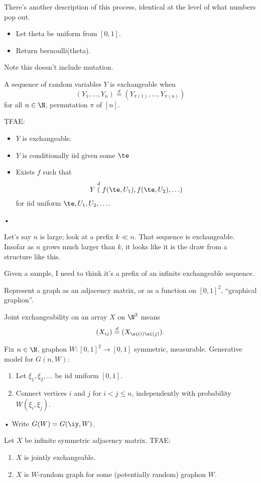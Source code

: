 There's another description of this process, identical at the level of what numbers pop out.
\begin{itemize}
\item
Let theta be uniform from $[0,1]$.
\item
Return bernoulli(theta).
\end{itemize}
Note this doesn't include mutation.

A sequence of random variables $Y$ is exchangeable when
$$
(Y_1,\ldots, Y_n) \stackrel d= (Y_{\pi(1)},\ldots, Y_{\pi(n)})
$$
for all $n\in \N$, permutation $\pi$ of $[n]$.

\begin{thm}[De Finetti]
TFAE:
\begin{itemize}
\item
$Y$ is exchangeable.
\item
$Y$ is conditionally iid given some $\te$
\item
Exists $f$ such that
$$
Y \stackrel d (f(\te,U_1),f(\te,U_2),\ldots)
$$
for iid uniform $\te, U_1,U_2,\ldots$.
\end{itemize}•
\end{thm}
Let's say $n$ is large; look at a prefix $k\ll n$. That sequence is exchangeable. Insofar as $n$ grows much larger than $k$, it looks like it is the draw from a structure like this.

Given a sample, I need to think it's a prefix of an infinite exchangeable sequence.

Represent a graph as an adjacency matrix, or as a function on $[0,1]^2$, ``graphical graphon''.

Joint exchangeability on an array $X$ on $\N^2$ means
$$(X_{ij})\stackrel d=(X_{\si(i)\si(j)}).$$


Fix $n\in \N$, graphon $W:[0,1]^2\to [0,1]$ symmetric, measurable. Generative model for $G(n,W)$:
\begin{enumerate}
\item
Let $\xi_1,\xi_2,\ldots$ be iid uniform $[0,1]$.
\item
Connect vertices $i$ and $j$ for $i<j\le n$, independently with probability $W(\xi_i,\xi_j)$.  
\end{enumerate}•
Write $G(W)=G(\iy,W)$.

\begin{thm}
Let $X$ be infinite symmetric adjacency matrix. TFAE:
\begin{enumerate}
\item
$X$ is jointly exchangeable.
\item
$X$ is $W$-random graph for some (potentially random) graphon $W$.
\end{enumerate}
\end{thm}

